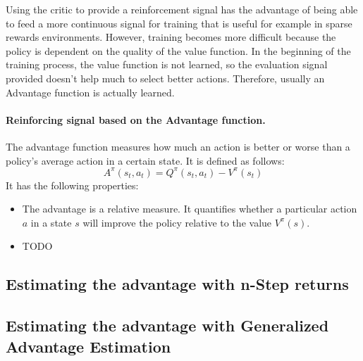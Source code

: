 \documentclass[12pt,a4paper]{report}
\begin{document}
			Using the critic to provide a reinforcement signal has the advantage of being able to feed a more continuous signal for training that is useful for example in sparse rewards environments. However, training becomes more difficult because the policy is dependent on the quality of the value function. In the beginning of the training process, the value function is not learned, so the evaluation signal provided doesn't help much to select better actions. Therefore, usually an Advantage function is actually learned.
			\paragraph{Reinforcing signal based on the Advantage function.}
			The advantage function measures how much an action is better or worse than a policy's average action in a certain state. It is defined as follows:
			\begin{equation}
			A^\pi(s_t, a_t) = Q^\pi(s_t, a_t) - V^\pi(s_t)
			\end{equation}
			It has the following properties:
			\begin{itemize}
				\item The advantage is a relative measure. It quantifies whether a particular action $a$ in a state $s$ will improve the policy relative to the value $V^\pi(s)$.
				\item TODO
			\end{itemize}
			\subsection{Estimating the advantage with n-Step returns}
			\subsection{Estimating the advantage with Generalized Advantage Estimation}
\end{document}
